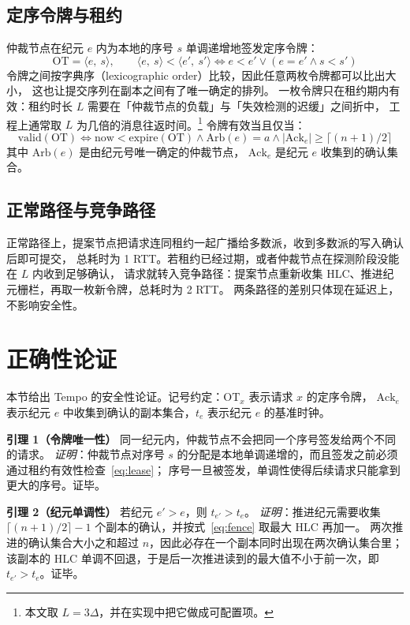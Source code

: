 \documentclass[12pt]{ctexart}
\begin{document}
\subsection{定序令牌与租约}
仲裁节点在纪元 $e$ 内为本地的序号 $s$ 单调递增地签发定序令牌：
\begin{equation}\label{eq:token}
  \mathrm{OT} = \langle e,\ s \rangle, \qquad
  \langle e,\ s \rangle < \langle e',\ s' \rangle \Leftrightarrow
  e < e' \lor (e = e' \land s < s')
\end{equation}
令牌之间按字典序（lexicographic order）比较，因此任意两枚令牌都可以比出大小，
这也让提交序列在副本之间有了唯一确定的排列。
一枚令牌只在租约期内有效：租约时长 $L$ 需要在「仲裁节点的负载」与「失效检测的迟缓」之间折中，
工程上通常取 $L$ 为几倍的消息往返时间。\footnote{本文取 $L = 3\Delta$，并在实现中把它做成可配置项。}
令牌有效当且仅当：
\begin{equation}\label{eq:lease}
  \mathrm{valid}(\mathrm{OT}) \Leftrightarrow
  \mathrm{now} < \mathrm{expire}(\mathrm{OT}) \land
  \mathrm{Arb}(e) = a \land
  |\mathrm{Ack}_{e}| \geq \lceil (n+1)/2 \rceil
\end{equation}
其中 $\mathrm{Arb}(e)$ 是由纪元号唯一确定的仲裁节点，
$\mathrm{Ack}_{e}$ 是纪元 $e$ 收集到的确认集合。

\subsection{正常路径与竞争路径}
正常路径上，提案节点把请求连同租约一起广播给多数派，收到多数派的写入确认后即可提交，
总耗时为 1 RTT。若租约已经过期，或者仲裁节点在探测阶段没能在 $L$ 内收到足够确认，
请求就转入竞争路径：提案节点重新收集 HLC、推进纪元栅栏，再取一枚新令牌，总耗时为 2 RTT。
两条路径的差别只体现在延迟上，不影响安全性。

\section{正确性论证}\label{sec:correct}
本节给出 Tempo 的安全性论证。记号约定：$\mathrm{OT}_{x}$ 表示请求 $x$ 的定序令牌，
$\mathrm{Ack}_{e}$ 表示纪元 $e$ 中收集到确认的副本集合，$t_{e}$ 表示纪元 $e$ 的基准时钟。

\textbf{引理 1（令牌唯一性）} 同一纪元内，仲裁节点不会把同一个序号签发给两个不同的请求。
\emph{证明}：仲裁节点对序号 $s$ 的分配是本地单调递增的，而且签发之前必须通过租约有效性检查~\eqref{eq:lease}；
序号一旦被签发，单调性使得后续请求只能拿到更大的序号。证毕。

\textbf{引理 2（纪元单调性）} 若纪元 $e' > e$，则 $t_{e'} > t_{e}$。
\emph{证明}：推进纪元需要收集 $\lceil (n+1)/2 \rceil - 1$ 个副本的确认，并按式~\eqref{eq:fence} 取最大 HLC 再加一。
两次推进的确认集合大小之和超过 $n$，因此必存在一个副本同时出现在两次确认集合里；
该副本的 HLC 单调不回退，于是后一次推进读到的最大值不小于前一次，即 $t_{e'} > t_{e}$。证毕。
\end{document}
